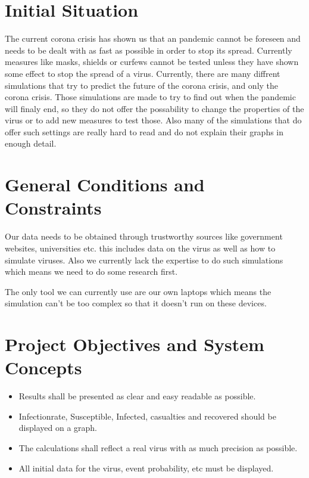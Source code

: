 \documentclass[12pt]{article}
\theoremstyle{definition}
\begin{document}
\pagebreak

\section{Initial Situation}

The current corona crisis has shown us that an pandemic cannot be foreseen and needs to be dealt with as fast as possible in order to stop its spread.
Currently measures like masks, shields or curfews cannot be tested unless they have shown some effect to stop the spread of a virus.
Currently, there are many diffrent simulations that try to predict the future of the corona crisis,
and only the corona crisis. Those simulations are made to try to find out when the pandemic will finaly end,
so they do not offer the possability to change the properties of the virus or to add new measures to test those.
Also many of the simulations that do offer such settings are really hard to read and do not explain their graphs in enough detail.

\pagebreak

\section{General Conditions and Constraints}

Our data needs to be obtained through trustworthy sources like government websites, universities etc. this includes data on the virus as well as how to simulate viruses.
Also we currently lack the expertise to do such simulations which means we need to do some research first.

The only tool we can currently use are our own laptops which means the simulation can't be too complex so that it doesn't run on these devices.

\pagebreak

\section{Project Objectives and System Concepts}

\begin{itemize}
\item Results shall be presented as clear and easy readable as possible.
\item Infectionrate, Susceptible, Infected, casualties and recovered should be displayed on a graph.
\item The calculations shall reflect a real virus with as much precision as possible.
\item All initial data for the virus, event probability, etc must be displayed.
\end{itemize}
\end{document}
